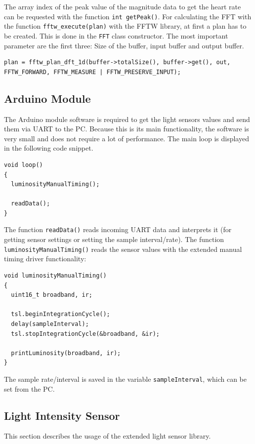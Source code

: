 \documentclass[notitlepage]{scrreprt}
\begin{document}
The array index of the peak value of the magnitude data to get the heart rate can be requested with the function \lstinline{int getPeak()}. For calculating the FFT with the function \lstinline{fftw_execute(plan)} with the FFTW library, at first a plan has to be created. This is done in the \lstinline{FFT} class constructor. The most important parameter are the first three: Size of the buffer, input buffer and output buffer.

\begin{lstlisting}[caption=FFT.c]
plan = fftw_plan_dft_1d(buffer->totalSize(), buffer->get(), out, FFTW_FORWARD, FFTW_MEASURE | FFTW_PRESERVE_INPUT);
\end{lstlisting}

\subsection{Arduino Module}
The Arduino module software is required to get the light sensors values and send them via UART to the PC. Because this is its main functionality, the software is very small and does not require a lot of performance. The main loop is displayed in the following code snippet.

\begin{lstlisting}
void loop()
{ 
  luminosityManualTiming();
  
  readData();
}
\end{lstlisting}

\newpage

The function \lstinline{readData()} reads incoming UART data and interprets it (for getting sensor settings or setting the sample interval/rate). The function \lstinline{luminosityManualTiming()} reads the sensor values with the extended manual timing driver functionality:

\begin{lstlisting}
void luminosityManualTiming()
{
  uint16_t broadband, ir;
  
  tsl.beginIntegrationCycle();
  delay(sampleInterval);
  tsl.stopIntegrationCycle(&broadband, &ir);
  
  printLuminosity(broadband, ir);
}
\end{lstlisting}

The sample rate/interval is saved in the variable \lstinline{sampleInterval}, which can be set from the PC.

\subsection{Light Intensity Sensor}
This section describes the usage of the extended light sensor library.
\end{document}
